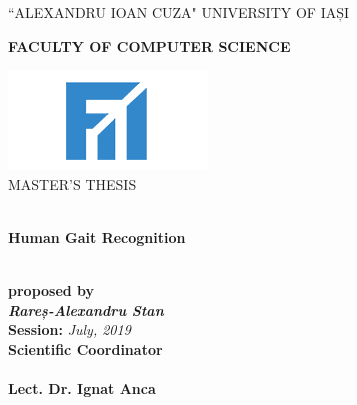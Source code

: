\documentclass[12pt]{article}
\theoremstyle{definition}
\begin{document}
	\begin{titlepage}
		\begin{center}
			\vspace{1cm}
			``ALEXANDRU IOAN CUZA" UNIVERSITY OF IAȘI
			\
			\\
			\begin{large}
				\textbf{FACULTY OF COMPUTER SCIENCE}\\
			\end{large}		
			\vspace{2.5cm}
			\includegraphics{fii.png}
			\
			\\
			\vspace{1cm}
			MASTER'S THESIS
			\begin{large}
				\
				\\
				\vspace{1.5cm}
				\textbf{Human Gait Recognition}
			\end{large}
			\\
			\vspace{1.5cm}
			\textbf{proposed by}
			\\
			\vspace{1.5cm}
			\textit{\textbf{Rareș-Alexandru Stan}}
			\\
			\vspace{2cm}
			\textbf{Session:} \textit{July, 2019}
			\\
			\vspace{1.5cm}
			\textbf{Scientific Coordinator}
			\
			\\
			\
			\\
			\textbf{Lect. Dr. Ignat Anca}
			
		\end{center}
	\end{titlepage}
	\newpage
	
\end{document}
